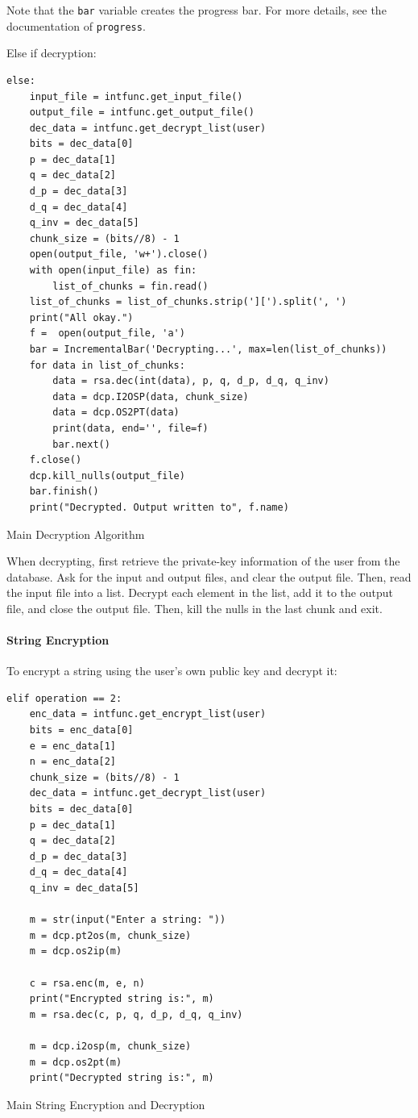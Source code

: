 \documentclass[titlepage]{article}
\newenvironment{longlisting}{\captionsetup{type=listing}}{}
\begin{document}
Note that the \texttt{bar} variable creates the progress bar. For more details, see the
documentation of \texttt{progress}.

Else if decryption:

\begin{longlisting}
\begin{verbatim}
else:
    input_file = intfunc.get_input_file()
    output_file = intfunc.get_output_file()
    dec_data = intfunc.get_decrypt_list(user)
    bits = dec_data[0]
    p = dec_data[1]
    q = dec_data[2]
    d_p = dec_data[3]
    d_q = dec_data[4]
    q_inv = dec_data[5]
    chunk_size = (bits//8) - 1
    open(output_file, 'w+').close()
    with open(input_file) as fin:
        list_of_chunks = fin.read()
    list_of_chunks = list_of_chunks.strip('][').split(', ')
    print("All okay.")
    f =  open(output_file, 'a')
    bar = IncrementalBar('Decrypting...', max=len(list_of_chunks))
    for data in list_of_chunks:
        data = rsa.dec(int(data), p, q, d_p, d_q, q_inv)
        data = dcp.I2OSP(data, chunk_size)
        data = dcp.OS2PT(data)
        print(data, end='', file=f)
        bar.next()
    f.close()
    dcp.kill_nulls(output_file)
    bar.finish()
    print("Decrypted. Output written to", f.name)
\end{verbatim}
\caption{Main Decryption Algorithm}
\end{longlisting}
When decrypting, first retrieve the private-key information of the user from the database. Ask for
the input and output files, and clear the output file. Then, read the input file into a list.
Decrypt each element in the list, add it to the output file, and close the output file. Then, kill
the nulls in the last chunk and exit.

\paragraph{String Encryption}
To encrypt a string using the user's own public key and decrypt it:
\begin{longlisting}
\begin{verbatim}
elif operation == 2:
    enc_data = intfunc.get_encrypt_list(user)
    bits = enc_data[0]
    e = enc_data[1]
    n = enc_data[2]
    chunk_size = (bits//8) - 1
    dec_data = intfunc.get_decrypt_list(user)
    bits = dec_data[0]
    p = dec_data[1]
    q = dec_data[2]
    d_p = dec_data[3]
    d_q = dec_data[4]
    q_inv = dec_data[5]

    m = str(input("Enter a string: "))
    m = dcp.pt2os(m, chunk_size)
    m = dcp.os2ip(m)

    c = rsa.enc(m, e, n)
    print("Encrypted string is:", m)
    m = rsa.dec(c, p, q, d_p, d_q, q_inv)

    m = dcp.i2osp(m, chunk_size)
    m = dcp.os2pt(m)
    print("Decrypted string is:", m)
\end{verbatim}
\caption{Main String Encryption and Decryption}
\end{longlisting}
\end{document}
